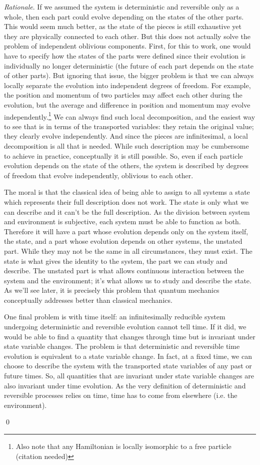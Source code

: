 \documentclass[aps,pra,10pt,twocolumn,floatfix,nofootinbib]{revtex4-1}
\numberwithin{equation}{section}
\theoremstyle{definition}
\newenvironment{rationale}{\emph{Rationale}.}{\qed}
\begin{document}
\begin{rationale}
	If we assumed the system is deterministic and reversible only as a whole, then each part could evolve depending on the states of the other parts. This would seem much better, as the state of the pieces is still exhaustive yet they are physically connected to each other. But this does not actually solve the problem of independent oblivious components. First, for this to work, one would have to specify how the states of the parts were defined since their evolution is individually no longer deterministic (the future of each part depends on the state of other parts). But ignoring that issue, the bigger problem is that we can always locally separate the evolution into independent degrees of freedom. For example, the position and momentum of two particles may affect each other during the evolution, but the average and difference in position and momentum may evolve independently.\footnote{Also note that any Hamiltonian is locally isomorphic to a free particle (citation needed)} We can always find such local decomposition, and the easiest way to see that is in terms of the transported variables: they retain the original value; they clearly evolve independently. And since the pieces are infinitesimal, a local decomposition is all that is needed. While such description may be cumbersome to achieve in practice, conceptually it is still possible. So, even if each particle evolution depends on the state of the others, the system is described by degrees of freedom that evolve independently, oblivious to each other.	
	
	The moral is that the classical idea of being able to assign to all systems a state which represents their full description does not work. The state is only what we can describe and it can't be the full description. As the division between system and environment is subjective, each system must be able to function as both. Therefore it will have a part whose evolution depends only on the system itself, the state, and a part whose evolution depends on other systems, the unstated part. While they may not be the same in all circumstances, they must exist. The state is what gives the identity to the system, the part we can study and describe. The unstated part is what allows continuous interaction between the system and the environment; it's what allows us to study and describe the state. As we'll see later, it is precisely this problem that quantum mechanics conceptually addresses better than classical mechanics.
	
	One final problem is with time itself: an infinitesimally reducible system undergoing deterministic and reversible evolution cannot tell time. If it did, we would be able to find a quantity that changes through time but is invariant under state variable changes. The problem is that deterministic and reversible time evolution is equivalent to a state variable change. In fact, at a fixed time, we can choose to describe the system with the transported state variables of any past or future times. So, all quantities that are invariant under state variable changes are also invariant under time evolution. As the very definition of deterministic and reversible processes relies on time, time has to come from elsewhere (i.e. the environment).
	

\end{rationale}
\end{document}
